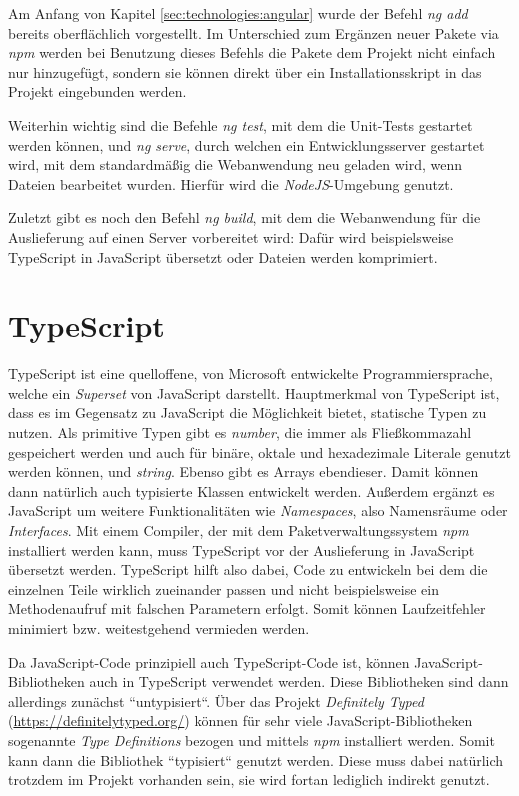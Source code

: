Am Anfang von Kapitel \ref{sec:technologies:angular} wurde der Befehl \textit{ng add} bereits oberflächlich vorgestellt. Im Unterschied zum Ergänzen neuer Pakete via \textit{npm} werden bei Benutzung dieses Befehls die Pakete dem Projekt nicht einfach nur hinzugefügt, sondern sie können direkt über ein Installationsskript in das Projekt eingebunden werden.

Weiterhin wichtig sind die Befehle \textit{ng test}, mit dem die Unit-Tests gestartet werden können, und \textit{ng serve}, durch welchen ein Entwicklungsserver gestartet wird, mit dem standardmäßig die Webanwendung neu geladen wird, wenn Dateien bearbeitet wurden. Hierfür wird die \textit{NodeJS}-Umgebung genutzt.

Zuletzt gibt es noch den Befehl \textit{ng build}, mit dem die Webanwendung für die Auslieferung auf einen Server vorbereitet wird: Dafür wird beispielsweise TypeScript in JavaScript übersetzt oder Dateien werden komprimiert.

\section{TypeScript}
\label{sec:technologies:ts}
TypeScript ist eine quelloffene, von Microsoft entwickelte Programmiersprache, welche ein \textit{Superset} von JavaScript darstellt. Hauptmerkmal von TypeScript ist, dass es im Gegensatz zu JavaScript die Möglichkeit bietet, statische Typen zu nutzen. Als primitive Typen gibt es \textit{number}, die immer als Fließkommazahl gespeichert werden und auch für binäre, oktale und hexadezimale Literale genutzt werden können, und \textit{string}. Ebenso gibt es Arrays ebendieser\cite{Types}. Damit können dann natürlich auch typisierte Klassen entwickelt werden. Außerdem ergänzt es JavaScript um weitere Funktionalitäten wie \textit{Namespaces}, also Namensräume oder \textit{Interfaces}. Mit einem Compiler, der mit dem Paketverwaltungssystem \textit{npm} installiert werden kann, muss TypeScript vor der Auslieferung in JavaScript übersetzt werden\cite{TypeScript}. TypeScript hilft also dabei, Code zu entwickeln bei dem die einzelnen Teile wirklich zueinander passen und nicht beispielsweise ein Methodenaufruf  mit falschen Parametern erfolgt. Somit können Laufzeitfehler minimiert bzw. weitestgehend vermieden werden.

Da JavaScript-Code prinzipiell auch TypeScript-Code ist, können JavaScript-Bibliotheken auch in TypeScript verwendet werden. Diese Bibliotheken sind dann allerdings zunächst ``untypisiert``. Über das Projekt \textit{Definitely Typed} (\href{https://definitelytyped.org/}{https://definitelytyped.org/}) können für sehr viele JavaScript-Bibliotheken sogenannte \textit{Type Definitions} bezogen und mittels \textit{npm} installiert werden. Somit kann dann die Bibliothek ``typisiert`` genutzt werden. Diese muss dabei natürlich trotzdem im Projekt vorhanden sein, sie wird fortan lediglich indirekt genutzt.

